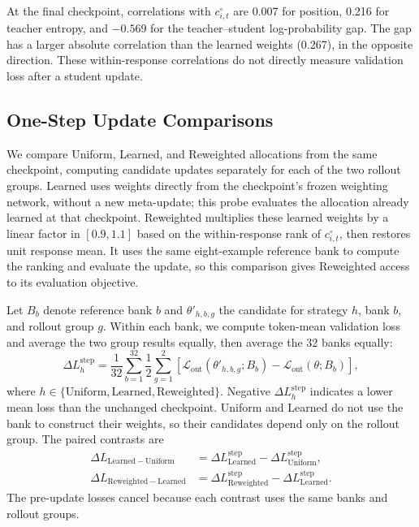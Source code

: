 \documentclass{article}
\theoremstyle{plain}
\theoremstyle{definition}
\theoremstyle{remark}
\begin{document}


At the final checkpoint, correlations with \(c^\circ_{i,t}\) are 0.007 for position, 0.216 for teacher entropy, and \(-0.569\) for the teacher--student log-probability gap. The gap has a larger absolute correlation than the learned weights (0.267), in the opposite direction. These within-response correlations do not directly measure validation loss after a student update.

\subsection{One-Step Update Comparisons}
We compare Uniform, Learned, and Reweighted allocations from the same checkpoint, computing candidate updates separately for each of the two rollout groups. Learned uses weights directly from the checkpoint's frozen weighting network, without a new meta-update; this probe evaluates the allocation already learned at that checkpoint. Reweighted multiplies these learned weights by a linear factor in \([0.9,1.1]\) based on the within-response rank of \(c^\circ_{i,t}\), then restores unit response mean. It uses the same eight-example reference bank to compute the ranking and evaluate the update, so this comparison gives Reweighted access to its evaluation objective.

Let \(B_b\) denote reference bank \(b\) and \(\theta'_{h,b,g}\) the candidate for strategy \(h\), bank \(b\), and rollout group \(g\). Within each bank, we compute token-mean validation loss and average the two group results equally, then average the 32 banks equally:
\begin{equation}
 \Delta L_h^{\mathrm{step}}
 =\frac{1}{32}\sum_{b=1}^{32}\frac{1}{2}\sum_{g=1}^{2}
 \left[\mathcal L_{\mathrm{out}}(\theta'_{h,b,g};B_b)
       -\mathcal L_{\mathrm{out}}(\theta;B_b)\right],
 \label{eq:trained-absolute-intervention}
\end{equation}
where \(h\in\{\mathrm{Uniform},\mathrm{Learned},\mathrm{Reweighted}\}\). Negative \(\Delta L_h^{\mathrm{step}}\) indicates a lower mean loss than the unchanged checkpoint. Uniform and Learned do not use the bank to construct their weights, so their candidates depend only on the rollout group. The paired contrasts are
\begin{align}
 \Delta L_{\mathrm{Learned}-\mathrm{Uniform}}
 &=\Delta L_{\mathrm{Learned}}^{\mathrm{step}}
   -\Delta L_{\mathrm{Uniform}}^{\mathrm{step}},
 \label{eq:checkpoint-intervention-difference}\\
 \Delta L_{\mathrm{Reweighted}-\mathrm{Learned}}
 &=\Delta L_{\mathrm{Reweighted}}^{\mathrm{step}}
   -\Delta L_{\mathrm{Learned}}^{\mathrm{step}}.
 \label{eq:checkpoint-reweighted-difference}
\end{align}
The pre-update losses cancel because each contrast uses the same banks and rollout groups.
\end{document}
